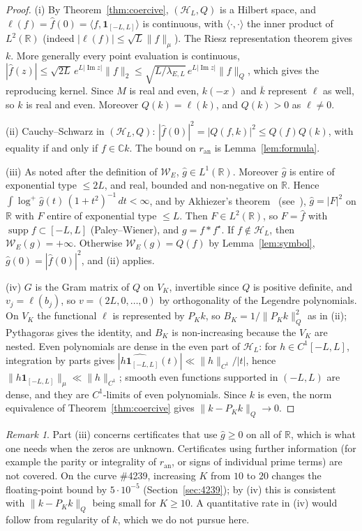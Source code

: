 \documentclass[11pt]{amsart}
\theoremstyle{remark}
\newtheorem{remark}[theorem]{Remark}
\theoremstyle{definition}
\newcommand{\R}{\mathbb{R}}
\newcommand{\C}{\mathbb{C}}
\newcommand{\Hs}{\mathcal{H}_L}
\newcommand{\ran}{r_{\mathrm{an}}}
\DeclareMathOperator{\supp}{supp}
\begin{document}
\begin{proof}
(i) By Theorem~\ref{thm:coercive}, $(\Hs,Q)$ is a Hilbert space, and $\ell(f)=\hat f(0)=\langle f,\mathbf 1_{[-L,L]}\rangle$
is continuous, with $\langle\cdot,\cdot\rangle$ the inner product of $L^2(\R)$ (indeed $|\ell(f)|\le\sqrt L\|f\|_\mu$). The Riesz representation theorem gives $k$. More generally every point evaluation is continuous, $|\hat f(z)|\le\sqrt{2L}\,e^{L|\operatorname{Im}z|}\|f\|_2\le\sqrt{L/\lambda_{E,L}}\,e^{L|\operatorname{Im}z|}\|f\|_Q$, which gives the reproducing kernel. Since $M$ is real and even, $k(-x)$ and
$\overline{k}$ represent $\ell$ as well, so $k$ is real and even. Moreover $Q(k)=\ell(k)$, and $Q(k)>0$ as $\ell\ne0$.

(ii) Cauchy--Schwarz in $(\Hs,Q)$: $|\hat f(0)|^2=|Q(f,k)|^2\le Q(f)Q(k)$, with equality if and only if $f\in\C k$. The bound on
$\ran$ is Lemma~\ref{lem:formula}.

(iii) As noted after the definition of $\mathcal W_E$, $\hat g\in L^1(\R)$. Moreover $\hat g$ is entire of exponential type $\le2L$,
and real, bounded and non-negative on $\R$. Hence $\int\log^+\hat g(t)\,(1+t^2)^{-1}\,dt<\infty$, and by Akhiezer's theorem~\cite{Akhiezer} (see~\cite[pp.~124--132]{Boas}), $\hat g=|F|^2$ on $\R$ with $F$ entire of exponential
type $\le L$. Then $F\in L^2(\R)$, so $F=\hat f$ with $\supp f\subset[-L,L]$ (Paley--Wiener), and $g=f*f^\star$. If
$f\notin\Hs$, then $\mathcal W_E(g)=+\infty$. Otherwise $\mathcal W_E(g)=Q(f)$ by Lemma~\ref{lem:symbol}, $\hat g(0)=|\hat f(0)|^2$, and (ii)
applies.

(iv) $G$ is the Gram matrix of $Q$ on $V_K$, invertible since $Q$ is positive definite, and $v_j=\ell(b_j)$, so $v=(2L,0,\dots,0)$ by orthogonality of the Legendre polynomials. On $V_K$ the functional $\ell$ is represented by $P_Kk$, so $B_K=1/\|P_Kk\|_Q^2$ as in (ii); Pythagoras gives
the identity, and $B_K$ is non-increasing because the $V_K$ are nested. Even polynomials are dense in the even part of $\Hs$: for $h\in C^1[-L,L]$, integration by parts gives $|\widehat{h\mathbf 1_{[-L,L]}}(t)|\ll\|h\|_{C^1}/|t|$, hence
$\|h\mathbf 1_{[-L,L]}\|_\mu\ll\|h\|_{C^1}$; smooth even functions supported in $(-L,L)$ are dense, and they are $C^1$-limits of
even polynomials. Since $k$ is even, the norm equivalence of Theorem~\ref{thm:coercive} gives $\|k-P_Kk\|_Q\to0$.
\end{proof}

\begin{remark}
Part (iii) concerns certificates that use $\hat g\ge0$ on all of $\R$, which is what one needs when the zeros are unknown.
Certificates using further information (for example the parity or integrality of $\ran$, or signs of individual prime
terms) are not covered. On the curve \#4239, increasing $K$ from $10$ to $20$ changes the floating-point bound by $5\cdot10^{-5}$ (Section~\ref{sec:4239}); by (iv) this is consistent with $\|k-P_Kk\|_Q$ being small
for $K\ge10$. A quantitative rate in (iv) would follow from regularity of $k$, which we do not pursue here.
\end{remark}
\end{document}
